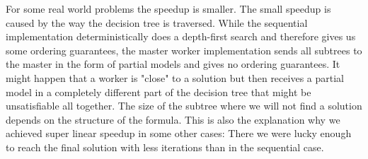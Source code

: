 \documentclass[letterpaper]{article}
\begin{document}
For some real world problems the speedup is smaller.
The small speedup is caused by the way the decision tree is traversed.
While the sequential implementation deterministically does a depth-first search and therefore gives us some ordering guarantees,
the master worker implementation sends all subtrees to the master in the form of partial models and gives no ordering guarantees.
It might happen that a worker is "close" to a solution but then receives a partial model in a completely different part of the decision tree that might be unsatisfiable all together.
The size of the subtree where we will not find a solution depends on the structure of the formula.
This is also the explanation why we achieved super linear speedup in some other cases:
There we were lucky enough to reach the final solution with less iterations than in the sequential case.
\end{document}

